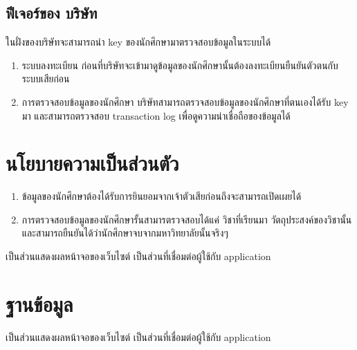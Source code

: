 \subsection{ฟีเจอร์ของ บริษัท}
\enskip \enskip \enskip \enskip \enskip 
ในฝั่งของบริษัทจะสามารถนำ key ของนักศึกษามาตรวจสอบข้อมูลในระบบได้
\begin{enumerate}
  \item ระบบลงทะเบียน ก่อนที่บริษัทจะเข้ามาดูข้อมูลของนักศึกษานั้นต้องลงทะเบียนยืนยันตัวตนกับระบบเสียก่อน
  \item การตรวจสอบข้อมูลของนักศึกษา บริษัทสามารถตรวจสอบข้อมูลของนักศึกษาที่ตนเองได้รับ key มา และสามารถตรวจสอบ transaction log เพื่อดูความน่าเชื่อถือของข้อมูลได้
  \end{enumerate}
\section{นโยบายความเป็นส่วนตัว}
\begin{enumerate}
  \item ข้อมูลของนักศึกษาต้องได้รับการยินยอมจากเจ้าตัวเสียก่อนถึงจะสามารถเปิดเผยได้
  \item การตรวจสอบข้อมูลของนักศึกษารั้นสามารตรวจสอบได้แค่ วิชาที่เรียนมา วัตถุประสงค์ของวิชานั้น และสามารถยืนยันได้ว่านักศึกษาจบจากมหาวิทยาลัยนั้นจริงๆ
  \end{enumerate}
\enskip \enskip \enskip \enskip \enskip 
เป็นส่วนแสดงผลหน้าจอของเว็บไซต์ เป็นส่วนที่เชื่อมต่อผู้ใช้กับ application


\section{ฐานข้อมูล}
\enskip \enskip \enskip \enskip \enskip 
เป็นส่วนแสดงผลหน้าจอของเว็บไซต์ เป็นส่วนที่เชื่อมต่อผู้ใช้กับ application



  
  

